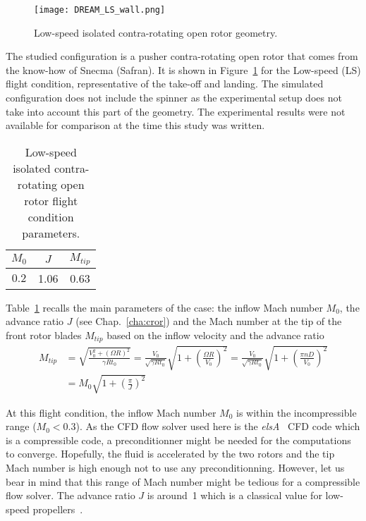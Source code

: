 

\begin{figure}[htp]
  \centering
  \texttt{[image: DREAM\_LS\_wall.png]}
  \caption{Low-speed isolated contra-rotating open rotor geometry.}
  \label{fig:dream_ls_wall}
\end{figure}

The studied configuration is a pusher contra-rotating open rotor
that comes from the know-how of Snecma (Safran). 
It is shown in Figure~\ref{fig:dream_ls_wall} for the
Low-speed (LS) flight condition, representative of the take-off
and landing.
The simulated configuration does not include the spinner as the
experimental setup does not take into account this part of the geometry.
The experimental results were not available for comparison
at the time this study was written.

\begin{table}[htp]
   \centering
  \begin{tabular}{ccc}
    \toprule
    $M_0$ & $J$ & $M_{tip}$ \\
    \midrule
    $0.2$ & 1.06 & 0.63 \\
    \bottomrule
  \end{tabular}
  \caption{Low-speed isolated contra-rotating open rotor flight condition parameters.}
  \label{tab:dream_ls_flight_condition}
\end{table} 
Table~\ref{tab:dream_ls_flight_condition} recalls the main
parameters of the case: the inflow Mach number $M_0$,
the advance ratio $J$ (see Chap.~\ref{cha:cror})
and the Mach number at the tip of
the front rotor blades $M_{tip}$ based on the inflow 
velocity and the advance ratio
\begin{equation}
  \begin{split}
    M_{tip} &= 
        \sqrt{\frac{V_0^2 + (\Omega R)^2}{\gamma R t_0}} =
        \frac{V_0}{\sqrt{\gamma R t_0}} 
          \sqrt{1 + \left(\frac{\Omega R}{V_0}\right)^2} =
        \frac{V_0}{\sqrt{\gamma R t_0}} 
          \sqrt{1 + \left(\frac{\pi n D}{
          V_0}\right)^2} \\
    &= M_0 \sqrt{1 + \left(\frac{\pi}{J} \right)^2}
  \end{split}
  \label{eq:m_tip}
\end{equation}

At this flight condition, the inflow Mach 
number $M_0$ is within the incompressible range
($M_0 < 0.3$). As the CFD flow solver used here is the
\textit{elsA}~\cite{Cambier2013} CFD code which is a compressible code, 
a preconditionner might be needed for the computations to converge. 
Hopefully, the fluid is accelerated by the two rotors
and the tip Mach number is high enough not to use any preconditionning.
However, let us bear in mind that this range of Mach number might
be tedious for a compressible flow solver.
The advance ratio $J$ is around~1 which is a classical value for
low-speed propellers~\cite{Bousquet2012}. 

